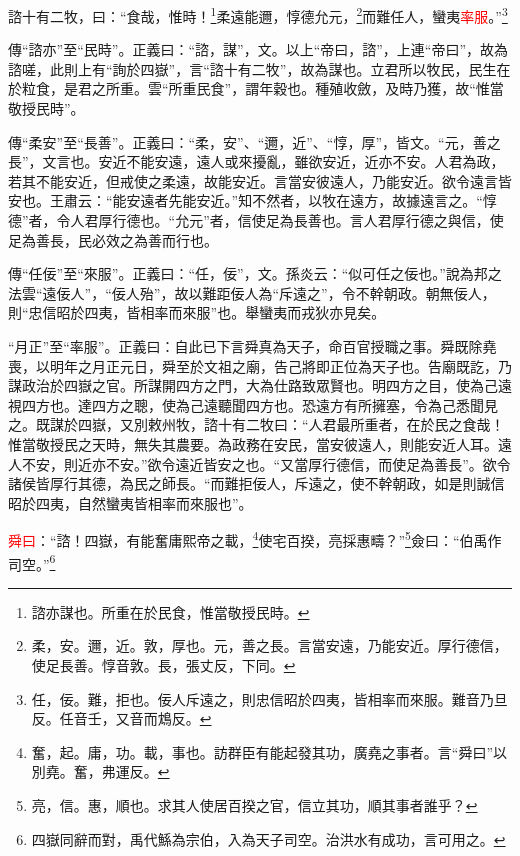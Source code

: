 諮十有二牧，曰：“食哉，惟時！\footnote{諮亦謀也。所重在於民食，惟當敬授民時。}柔遠能邇，惇德允元，\footnote{柔，安。邇，近。敦，厚也。元，善之長。言當安遠，乃能安近。厚行德信，使足長善。惇音敦。長，張丈反，下同。}而難任人，蠻夷\textcolor{red}{率服}。”\footnote{任，佞。難，拒也。佞人斥遠之，則忠信昭於四夷，皆相率而來服。難音乃旦反。任音壬，又音而鴆反。}

{\noindent\zhuan{}\fzbyks 傳“諮亦”至“民時”。正義曰：“諮，謀”，文。以上“帝曰，諮”，上連“帝曰”，故為諮嗟，此則上有“詢於四嶽”，言“諮十有二牧”，故為謀也。立君所以牧民，民生在於粒食，是君之所重。雲“所重民食”，謂年穀也。種殖收斂，及時乃獲，故“惟當敬授民時”。 \par}

{\noindent\zhuan{}\fzbyks 傳“柔安”至“長善”。正義曰：“柔，安”、“邇，近”、“惇，厚”，皆文。“元，善之長”，文言也。安近不能安遠，遠人或來擾亂，雖欲安近，近亦不安。人君為政，若其不能安近，但戒使之柔遠，故能安近。言當安彼遠人，乃能安近。欲令遠言皆安也。王肅云：“能安遠者先能安近。”知不然者，以牧在遠方，故據遠言之。“惇德”者，令人君厚行德也。“允元”者，信使足為長善也。言人君厚行德之與信，使足為善長，民必效之為善而行也。 \par}

{\noindent\zhuan{}\fzbyks 傳“任佞”至“來服”。正義曰：“任，佞”，文。孫炎云：“似可任之佞也。”說為邦之法雲“遠佞人”，“佞人殆”，故以難距佞人為“斥遠之”，令不幹朝政。朝無佞人，則“忠信昭於四夷，皆相率而來服”也。舉蠻夷而戎狄亦見矣。 \par}

{\noindent\shu{}\fzkt “月正”至“率服”。正義曰：自此已下言舜真為天子，命百官授職之事。舜既除堯喪，以明年之月正元日，舜至於文祖之廟，告己將即正位為天子也。告廟既訖，乃謀政治於四嶽之官。所謀開四方之門，大為仕路致眾賢也。明四方之目，使為己遠視四方也。達四方之聰，使為己遠聽聞四方也。恐遠方有所擁塞，令為己悉聞見之。既謀於四嶽，又別敕州牧，諮十有二牧曰：“人君最所重者，在於民之食哉！惟當敬授民之天時，無失其農要。為政務在安民，當安彼遠人，則能安近人耳。遠人不安，則近亦不安。”欲令遠近皆安之也。“又當厚行德信，而使足為善長”。欲令諸侯皆厚行其德，為民之師長。“而難拒佞人，斥遠之，使不幹朝政，如是則誠信昭於四夷，自然蠻夷皆相率而來服也”。 \par}

\textcolor{red}{舜曰}：“諮！四嶽，有能奮庸熙帝之載，\footnote{奮，起。庸，功。載，事也。訪群臣有能起發其功，廣堯之事者。言“舜曰”以別堯。奮，弗運反。}使宅百揆，亮採惠疇？”\footnote{亮，信。惠，順也。求其人使居百揆之官，信立其功，順其事者誰乎？}僉曰：“伯禹作司空。”\footnote{四嶽同辭而對，禹代鯀為宗伯，入為天子司空。治洪水有成功，言可用之。}

